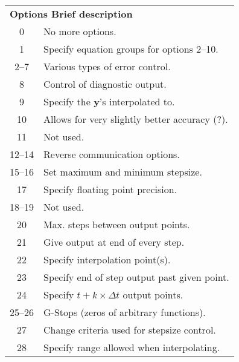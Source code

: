\documentclass[twoside]{MATH77}
\begin{document}
\begin{description}
\begin{tabular}{@{}cp{2.9in}}
 \multicolumn{2}{l}{\bf \hspace{-5pt}Options \hspace{.4in} Brief
description}\\ 0 & No more options.\\
  1 & Specify equation groups for options 2--10.\\
  2--7 & Various types of error control.\\
  8 & Control of diagnostic output.\\
  9 & Specify the ${\mathbf y}$'s interpolated to.\\
  10 & Allows for very slightly better accuracy (?).\\
  11 & Not used.\\
  12--14 & Reverse communication options.\\
  15--16 & Set maximum and minimum stepsize.\\
  17 & Specify floating point precision.\\
  18--19 & Not used.\\
  20 & Max. steps between output points.\\
  21 & Give output at end of every step.\\
  22 & Specify interpolation point(s).\\
  23 & Specify end of step output past given point.\\
  24 & Specify $t+k \times \Delta t$ output points.\\
  25--26 & G-Stops (zeros of arbitrary functions).\\
  27 & Change criteria used for stepsize control.\\
  28 & Specify range allowed when interpolating.\\
\end{tabular}


\end{description}
\end{document}
